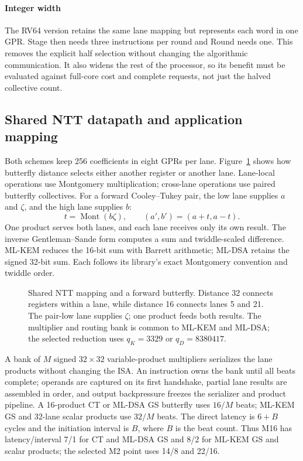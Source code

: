 \documentclass[conference,letterpaper]{IEEEtran}
\newcommand{\mont}{\operatorname{Mont}}
\begin{document}
\paragraph{Integer width}
The RV64 version retains the same lane mapping but represents each word
in one GPR. Stage then needs three instructions per round and Round needs
one. This removes the explicit half selection without changing the
algorithmic communication. It also widens the rest of the processor,
so its benefit must be evaluated against full-core cost and complete
requests, not just the halved collective count.

\subsection{Shared NTT datapath and application mapping}
Both schemes keep 256 coefficients in eight GPRs per lane.
Figure~\ref{fig:ntt} shows how butterfly distance selects either another
register or another lane. Lane-local operations use Montgomery
multiplication; cross-lane operations use paired butterfly collectives.
For a forward Cooley--Tukey pair, the low lane supplies $a$ and $\zeta$,
and the high lane supplies $b$:
\begin{equation}
 t=\mont(b\zeta),\qquad (a',b')=(a+t,a-t).
\end{equation}
One product serves both lanes, and each lane receives only its own result.
The inverse Gentleman--Sande form computes a sum and twiddle-scaled
difference. ML-KEM reduces the 16-bit sum with Barrett arithmetic;
ML-DSA retains the signed 32-bit sum. Each follows its library's exact
Montgomery convention and twiddle order.

\begin{figure}[t]
\centering
\caption{Shared NTT mapping and a forward butterfly. Distance 32
connects registers within a lane, while distance 16 connects lanes 5 and
21. The pair-low lane supplies $\zeta$; one product feeds both results.
The multiplier and routing bank is common to ML-KEM and ML-DSA; the
selected reduction uses $q_K=3329$ or $q_D=8380417$.}
\label{fig:ntt}
\end{figure}

A bank of $M$ signed $32\times32$ variable-product multipliers serializes
the lane products without changing the ISA. An instruction owns the bank
until all beats complete; operands are captured on its first handshake,
partial lane results are assembled in order, and output backpressure freezes
the serializer and product pipeline. A 16-product CT or ML-DSA GS butterfly
uses $16/M$ beats; ML-KEM GS and 32-lane scalar products use $32/M$ beats.
The direct latency is $6+B$ cycles and the initiation interval is $B$, where
$B$ is the beat count. Thus M16 has latency/interval 7/1 for CT and ML-DSA
GS and 8/2 for ML-KEM GS and scalar products; the selected M2 point uses
14/8 and 22/16.
\end{document}

